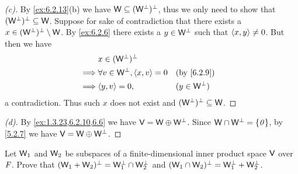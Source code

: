 \begin{proof}[(c)]
  By \cref{ex:6.2.13}(b) we have \(\mathsf{W} \subseteq (\mathsf{W}^{\perp})^{\perp}\), thus we only need to show that \((\mathsf{W}^{\perp})^{\perp} \subseteq \mathsf{W}\).
  Suppose for sake of contradiction that there exists a \(x \in (\mathsf{W}^{\perp})^{\perp} \setminus \mathsf{W}\).
  By \cref{ex:6.2.6} there exists a \(y \in \mathsf{W}^{\perp}\) such that \(\left\langle x, y\right\rangle \neq 0\).
  But then we have
  \begin{align*}
             & x \in (\W^{\perp})^{\perp}                                             \\
    \implies & \forall v \in \W^{\perp}, \inn{x, v} = 0 &  & \text{(by \cref{6.2.9})} \\
    \implies & \inn{y, v} = 0,                          &  & (y \in \W^{\perp})
  \end{align*}
  a contradiction.
  Thus such \(x\) does not exist and \((\mathsf{W}^{\perp})^{\perp} \subseteq \mathsf{W}\).
\end{proof}

\begin{proof}[(d)]
  By \cref{ex:1.3.23,6.2.10,6.6} we have \(\mathsf{V} = \mathsf{W} \oplus \mathsf{W}^{\perp}\).
  Since \(\mathsf{W} \cap \mathsf{W}^{\perp} = \left\lbrace\mathit{0}\right\rbrace\), by \cref{5.2.7} we have \(\mathsf{V} = \mathsf{W} \oplus \mathsf{W}^{\perp}\).
\end{proof}

\begin{ex}\label{ex:6.2.14}
  Let \(\mathsf{W}_1\) and \(\mathsf{W}_2\) be subspaces of a finite-dimensional inner product space \(\mathsf{V}\) over \(\mathit{F}\).
  Prove that \((\mathsf{W}_1 + \mathsf{W}_2)^{\perp} = \mathsf{W}_1^{\perp} \cap \mathsf{W}_2^{\perp}\) and \((\mathsf{W}_1 \cap \mathsf{W}_2)^{\perp} = \mathsf{W}_1^{\perp} + \mathsf{W}_2^{\perp}\).
\end{ex}

